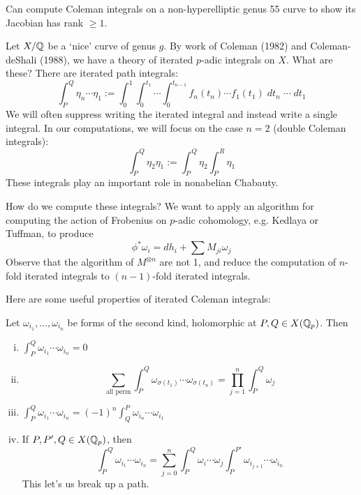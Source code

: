 \begin{ex}[B-Tuffman]
Can compute Coleman integrals on a non-hyperelliptic genus 55 curve to show its Jacobian has rank $\geq 1$.
\end{ex}


Let $X/\mathbb{Q}$ be a `nice' curve of genus $g$. By work of Coleman (1982) and Coleman-deShali (1988), we have a theory of iterated $p$-adic integrals on $X$. What are these? There are iterated path integrals:
	\[
	\int_P^Q \eta_n \cdots \eta_1:= \int_0^1 \int_0^{t_1} \cdots \int_0^{t_{n-1}} f_n(t_n) \cdots f_1(t_1) \;dt_n \; \cdots \; dt_1
	\]
We will often suppress writing the iterated integral and instead write a single integral. In our computations, we will focus on the case $n=2$ (double Coleman integrals):
	\[
	\int_P^Q \eta_2 \eta_1:= \int_P^Q \eta_2 \int_P^R \eta_1
	\]
These integrals play an important role in nonabelian Chabauty.


How do we compute these integrals? We want to apply an algorithm for computing the action of Frobenius on $p$-adic cohomology, e.g. Kedlaya or Tuffman, to produce
	\[
	\phi^* \omega_i= dh_i + \sum M_{ji} \omega_j
	\]
Observe that the algorithm of $M^{\otimes n}$ are not 1, and reduce the computation of $n$-fold iterated integrals to $(n-1)$-fold iterated integrals. 


Here are some useful properties of iterated Coleman integrals:


\begin{prop}
Let $\omega_{i_1}, \ldots, \omega_{i_n}$ be forms of the second kind, holomorphic at $P,Q \in X(\mathbb{Q}_p)$. Then
\begin{enumerate}[(i)]
\item $\int_P^Q \omega_{i_1} \cdots \omega_{i_n}= 0$
\item
	\[
	\sum_{\text{all perm}} \int_P^Q \omega_{\sigma(t_1)} \cdots \omega_{\sigma(t_n)}= \prod_{j=1}^n \int_P^Q \omega_j
	\]
\item $\int_P^Q \omega_{i_1} \cdots \omega_{i_n}= (-1)^n \int_Q^P \omega_{i_n} \cdots \omega_{i_1}$
\item If $P,P', Q \in X(\mathbb{Q}_p)$, then
	\[
	\int_P^Q \omega_{i_1} \cdots \omega_{i_n}= \sum_{j=0}^n \int_P^Q \omega_i \cdots \omega_j \int_P^{P'} \omega_{i_{j+1}} \cdots \omega_{i_n}
	\]
This let's us break up a path.
\end{enumerate}
\end{prop}


